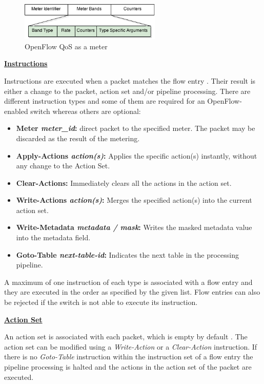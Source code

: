 \begin{figure}[H]
\centering
\includegraphics[width=0.6\textwidth]{images/fundamentals/openflow_qos.png}
\caption{OpenFlow QoS as a meter}
\end{figure}


\underline{\textbf{Instructions}}

Instructions are executed when a packet matches the flow entry \cite{ofspecification}. Their result is either a change to the packet, action set and/or pipeline processing. There are different instruction types and some of them are required for an OpenFlow-enabled switch whereas others are optional:

\begin{itemize}
\item \textbf{Meter \textit{meter\_id}:} direct packet to the specified meter. The packet may be discarded as the result of the metering.
\item \textbf{Apply-Actions \textit{action(s)}:} Applies the specific action(s) instantly, without any change to the Action Set.
\item \textbf{Clear-Actions:} Immediately clears all the actions in the action set.
\item \textbf{Write-Actions \textit{action(s)}:} Merges the specified action(s) into the current action set.
\item \textbf{Write-Metadata \textit{metadata / mask}:} Writes the masked metadata value into the metadata field.
\item \textbf{Goto-Table \textit{next-table-id}:} Indicates the next table in the processing pipeline.
\end{itemize}

A maximum of one instruction of each type is associated with a flow entry and they are executed in the order as specified by the given list. Flow entries can also be rejected if the switch is not able to execute its instruction.


\underline{\textbf{Action Set}}

An action set is associated with each packet, which is empty by default \cite{ofspecification}. The action set can be modified using a \textit{Write-Action} or a \textit{Clear-Action} instruction. If there is no \textit{Goto-Table} instruction within the instruction set of a flow entry the pipeline processing is halted and the actions in the action set of the packet are executed.


